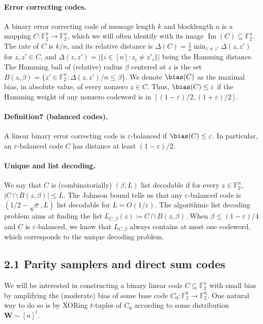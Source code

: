 \paragraph{Error correcting codes.}
A binary error correcting code of message length $k$ and blocklength $n$ is a mapping $C:\mathbb F_2^k\to\mathbb F_2^n$, which we will often identify with its image $\operatorname{Im}(C)\subseteq\mathbb F_2^n$. The rate of $C$ is $k/n$, and its relative distance is $\Delta(C)=\frac1n\min_{z\neq z'}\Delta(z,z')$ for $z,z'\in C$, and $\Delta(z,z')=|\{i\in[n]:z_i\neq z'_i\}|$ being the Hamming distance. The Hamming ball of (relative) radius $\beta$ centered at $z$ is the set $B(z,\beta)=\{z'\in\mathbb F_2^n:\Delta(z,z')/n\leq\beta\}$.
We denote $\bias(C)$ as the maximal bias, in absolute value, of every nonzero $z\in C$. Thus, $\bias(C)\leq\varepsilon$ if the Hamming weight of any nonzero codeword is in $[(1-\varepsilon)/2,(1+\varepsilon)/2]$.
\paragraph{Definition7 (balanced codes).} A linear binary error correcting code is $\varepsilon$-balanced if $\bias(C)\leq\varepsilon$. In particular, an $\varepsilon$-balanced code $C$ has distance at least $(1-\varepsilon)/2$.
\paragraph{Unique and list decoding.}
We say that $C$ is (combinatorially) $(\beta,L)$ list decodable if for every $z\in\mathbb F_2^n$, $|C\cap B(z,\beta)|\leq L$. The Johnson bound tells us that any $\varepsilon$-balanced code is $(1/2-\sqrt\varepsilon,L)$ list decodable for $L=O(1/\varepsilon)$. The algorithmic list decoding problem aims at finding the list $L_{C,\beta}(z)\coloneqq C\cap B(z,\beta)$. When $\beta\leq(1-\varepsilon)/4$ and $C$ is $\varepsilon$-balanced, we know that $L_{C,\beta}$ always contains at most one codeword, which corresponds to the unique decoding problem.
\subsection*{2.1 Parity samplers and direct sum codes}
We will be interested in constructing a binary linear code $C\subseteq\mathbb F_2^{\bar n}$ with small bias by amplifying the (moderate) bias of some base code $C_0:\mathbb F_2^k\to\mathbb F_2^n$. One natural way to do so is by XORing $t$-tuples of $C_0$ according to some distribution $\mathbf W\sim[n]^t$.
